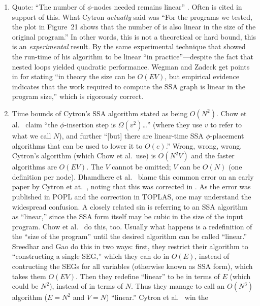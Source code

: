 \documentclass[12pt,titlepage,twoside]{article}
\begin{document}
\begin{enumerate}
\item Quote: ``The number of $\phi$-nodes needed remains linear''
\cite{sreedhar95:lintime}.  Often \cite{cytron91:ssa} is cited in
support of this.  What Cytron \emph{actually} said was ``For the
programs we tested, the plot in Figure~21 shows that the number of
 is also linear in the size of the original program.''
In other words, this is not a theoretical or hard bound, this is an
\emph{experimental} result.  By the same experimental technique that
showed the run-time of his algorithm to be linear ``in
practice''---despite the fact that nested  loops
yielded quadratic performance.  Wegman and Zadeck get points in
\cite{wegman91:scc} for stating ``in theory the size can be $O(EV)$,
but empirical evidence indicates that the work required to compute the
SSA graph is linear in the program size,'' which is rigorously correct.
\item Time bounds of Cytron's SSA algorithm stated as being $O(N^2)$.
Chow et al.\ \cite{chow97:ssapre} claim ``the $\phi$-insertion step is
$\Omega(v^2)$\ldots'' (where they use $v$ to refer to what we call
$N$), and further ``[but] there are linear-time SSA $\phi$-placement
algorithms that can be used to lower it to $O(e)$.''  Wrong, wrong,
wrong.  Cytron's algorithm (which Chow et al.\ use) is $O(N^2 V)$ and
the faster algorithms are $O(EV)$.  The $V$ cannot be omitted; $V$ can
be $O(N)$ (one definition per node).  Dhamdhere et al.\
\cite{dhamdhere92:large} blame this common error on an early paper by
Cytron et at.\ \cite{cytron89:ssa}, noting that this was corrected in
\cite{cytron91:ssa}.  As the error was published in POPL and the
correction in TOPLAS, one may understand the widespread confusion.  A
closely related sin is referring to an SSA algorithm as ``linear,''
since the SSA form itself may be cubic in the size of the input
program.  Chow et al.\ \cite{chow97:ssapre} do this, too.  Usually
what happens is a redefinition of the ``size of the program'' until
the desired algorithm can be called ``linear.''  Sreedhar and Gao
\cite{sreedhar95:lintime} do this in two ways: first, they restrict
their algorithm to ``constructing a single SEG,'' which they can do in
$O(E)$, instead of contructing the SEGs for all variables (otherwise
known as SSA form), which takes them $O(EV)$.  Then they redefine
``linear'' to be in terms of $E$ (which could be $N^2$), instead of in
terms of $N$.  Thus they manage to call an $O(N^3)$ algorithm ($E=N^2$
and $V=N$) ``linear.''  Cytron et al.\ \cite{cytron91:ssa} win the

\end{enumerate}
\end{document}
